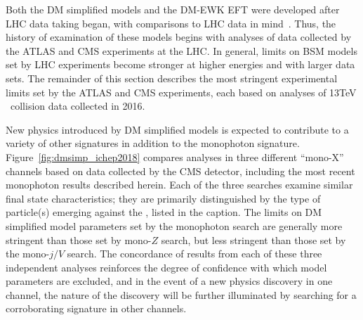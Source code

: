 \documentclass[oneside, letterpaper, 12pt, oldfontcommands]{memoir}
\begin{document}
Both the DM simplified models and the DM-EWK EFT were developed after LHC data taking began, with comparisons to LHC data in mind~\cite{ref:1507.00966, ref:PhysRevD.89.056011}.
Thus, the history of examination of these models begins with analyses of data collected by the ATLAS and CMS experiments at the LHC.
In general, limits on BSM models set by LHC experiments become stronger at higher energies and with larger data sets.
The remainder of this section describes the most stringent experimental limits set by the ATLAS and CMS experiments, each based on analyses of 13\unit{TeV} \Pp\Pp\ collision data
collected in 2016.

New physics introduced by DM simplified models is expected to contribute to a variety of other signatures in addition to the monophoton signature. Figure~\ref{fig:dmsimp_ichep2018} compares
analyses in three different ``mono-X'' channels based on data collected by the CMS detector, including the most recent monophoton results described herein. Each of the three
searches examine similar final state characteristics; they are primarily distinguished by the type of particle(s) emerging against the \vecMET, listed in the caption.
The limits on DM simplified model parameters set by the monophoton search are generally more stringent than those set by mono-$Z$ search, but less stringent
than those set by the mono-$j/V$ search. The concordance of results from each of these three independent analyses reinforces the degree of confidence with which model
parameters are excluded, and in the event of a new physics discovery in one channel, the nature of the discovery will be further illuminated by searching for a corroborating
signature in other channels.
\end{document}
